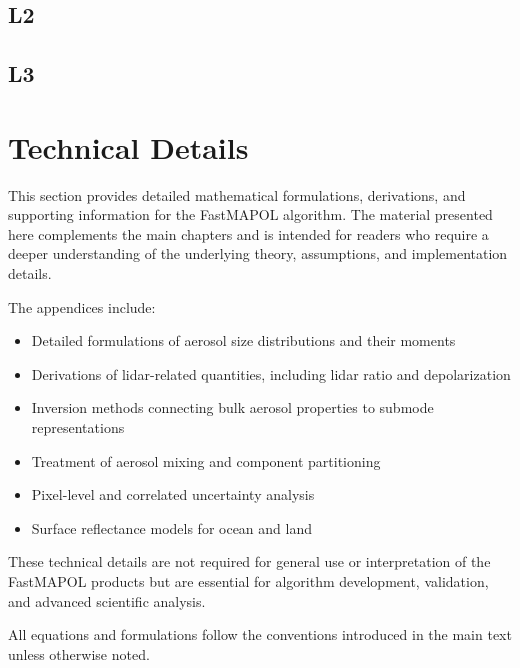 \documentclass[
  letterpaper,
]{scrbook}
\providecommand{\tightlist}{%
  \setlength{\itemsep}{0pt}\setlength{\parskip}{0pt}}
\begin{document}
\section{L2}\label{l2}

\section{L3}\label{l3}

\cleardoublepage
{}
{}
\appendix

\chapter{Technical Details}\label{technical-details}

This section provides detailed mathematical formulations, derivations,
and supporting information for the FastMAPOL algorithm. The material
presented here complements the main chapters and is intended for readers
who require a deeper understanding of the underlying theory,
assumptions, and implementation details.

The appendices include:

\begin{itemize}
\tightlist
\item
  Detailed formulations of aerosol size distributions and their
  moments\\
\item
  Derivations of lidar-related quantities, including lidar ratio and
  depolarization\\
\item
  Inversion methods connecting bulk aerosol properties to submode
  representations\\
\item
  Treatment of aerosol mixing and component partitioning\\
\item
  Pixel-level and correlated uncertainty analysis\\
\item
  Surface reflectance models for ocean and land
\end{itemize}

These technical details are not required for general use or
interpretation of the FastMAPOL products but are essential for algorithm
development, validation, and advanced scientific analysis.

All equations and formulations follow the conventions introduced in the
main text unless otherwise noted.
\end{document}
